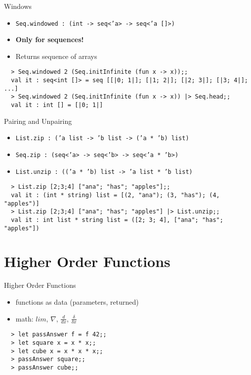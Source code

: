\documentclass{beamer}
\begin{document}
\begin{frame}[fragile]{Windows}
  \begin{itemize}
    \item \texttt{Seq.windowed : (int -> seq<'a> -> seq<'a []>)}
    \item \textbf{Only for sequences!}
    \item Returns sequence of arrays
  \end{itemize}
  \tiny
  \begin{verbatim}
  > Seq.windowed 2 (Seq.initInfinite (fun x -> x));;
  val it : seq<int []> = seq [[|0; 1|]; [|1; 2|]; [|2; 3|]; [|3; 4|]; ...]
  > Seq.windowed 2 (Seq.initInfinite (fun x -> x)) |> Seq.head;;
  val it : int [] = [|0; 1|]
  \end{verbatim}
\end{frame}

\begin{frame}[fragile]{Pairing and Unpairing}
  \small
  \begin{itemize}
    \item \texttt{List.zip : ('a list -> 'b list -> ('a * 'b) list)}
    \item \texttt{Seq.zip : (seq<'a> -> seq<'b> -> seq<'a * 'b>)}
    \item \texttt{List.unzip : (('a * 'b) list -> 'a list * 'b list)}
  \end{itemize}
  \tiny
  \begin{verbatim}
  > List.zip [2;3;4] ["ana"; "has"; "apples"];;
  val it : (int * string) list = [(2, "ana"); (3, "has"); (4, "apples")]
  > List.zip [2;3;4] ["ana"; "has"; "apples"] |> List.unzip;;
  val it : int list * string list = ([2; 3; 4], ["ana"; "has"; "apples"])
  \end{verbatim}
\end{frame}

\section{Higher Order Functions}
\frame{\tableofcontents[currentsection]}

\begin{frame}[fragile]{Higher Order Functions}
  \begin{itemize}[<+->]
    \item functions as data (parameters, returned)
    \item math: $lim$, $\nabla$, $\frac{d}{dx}$, $\frac{\delta}{\delta x}$
  \end{itemize}
  \pause
  \begin{verbatim}
  > let passAnswer f = f 42;;
  > let square x = x * x;;
  > let cube x = x * x * x;;
  > passAnswer square;;
  > passAnswer cube;;
  \end{verbatim}
\end{frame}
\end{document}
